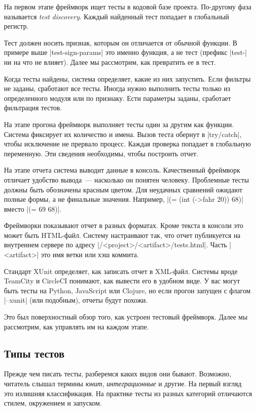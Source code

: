 На первом этапе фреймворк ищет тесты в кодовой базе проекта. По-другому фаза
называется \emph{test discovery}. Каждый найденный тест попадает в глобальный
регистр.

Тест должен носить признак, которым он отличается от обычной функции. В примере
выше \spverb|test-sign-params| это именно функция, а не тест (префикс
\spverb|test-| ни на что не влияет). Далее мы рассмотрим, как превратить ее в
тест.

Когда тесты найдены, система определяет, какие из них запустить. Если фильтры не
заданы, сработают все тесты. Иногда нужно выполнить тесты только из
определенного модуля или по признаку. Ести параметры заданы, сработает
фильтрация тестов.

На этапе прогона фреймворк выполняет тесты один за другим как функции. Система
фиксирует их количество и имена. Вызов теста обернут в \spverb|try/catch|, чтобы
исключение не прервало процесс. Каждая проверка попадает в глобальную
переменную. Эти сведения необходимы, чтобы построить отчет.

На этапе отчета система выводит данные в консоль. Качественный фреймворк
отличает удобство вывода~--- насколько он понятен человеку. Проблемные тесты
должны быть обозначены красным цветом. Для неудачных сравнений ожидают полные
формы, а не финальные значения. Например, \spverb|(= (int (->fahr 20)) 68)|
вместо \spverb|(= 69 68)|.

Фреймворки показывают отчет в разных форматах. Кроме текста в консоли это может
быть HTML-файл. Систему настраивают так, что отчет публикуется на внутреннем
сервере по адресу \spverb|/<project>/<artifact>/tests.html|. Часть
\spverb|<artifact>| это имя ветки или хэш коммита.

Стандарт XUnit определяет, как записать отчет в XML-файл. Системы вроде TeamCity
и CircleCI понимают, как вывести его в удобном виде. У вас могут быть тесты на
Python, JavaScript или Clojure, но если прогон запущен с флагом \spverb|--xunit|
(или подобным), отчеты будут похожи.

Это был поверхностный обзор того, как устроен тестовый фреймворк. Далее мы
рассмотрим, как управлять им на каждом этапе.

\subsection{Типы тестов}

Прежде чем писать тесты, разберемся каких видов они бывают. Возможно, читатель
слышал термины \emph{юнит}, \emph{интеграционные} и другие. На первый взгляд это
излишняя классификация. На практике тесты из разных категорий отличаются стилем,
окружением и запуском.

